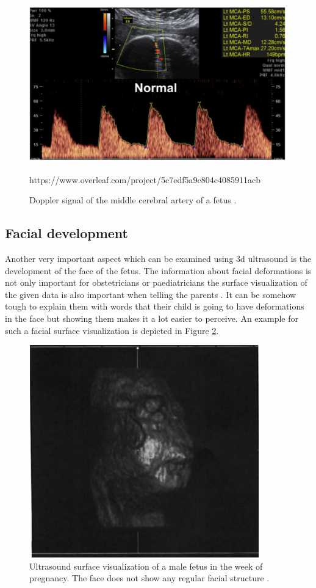 \begin{figure} [htb!]
    \centering
	\includegraphics[width=13cm]{content/images/cardioPulmonary}
	\caption{Doppler signal of the middle cerebral artery of a fetus \cite{Baschat2011ExaminationSystem}.}
https://www.overleaf.com/project/5c7edf5a9c804c4085911acb	\label{fig:cardioPulmonary}
\end{figure}

\newpage
\subsection{Facial development}

Another very important aspect which can be examined using \gls{3d} ultrasound is the development of the face of the fetus. The information about facial deformations is not only important for obstetricians or paediatricians the surface visualization of the given data is also important when telling the parents \cite{Lee1995ThreeMode}. It can be somehow tough to explain them with words that their child is going to have deformations in the face but showing them makes it a lot easier to perceive. An example for such a facial surface visualization is depicted in Figure \ref{fig:face}.

\begin{figure} [htb!]
    \centering
	\includegraphics[width=10cm]{content/images/face}
	\caption{Ultrasound surface visualization of a male fetus in the  week of pregnancy. The face does not show any regular facial structure \cite{Lee1995ThreeMode}.}
	\label{fig:face}
\end{figure}

